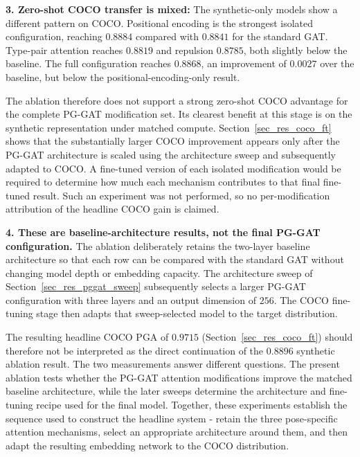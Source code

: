 \textbf{3. Zero-shot COCO transfer is mixed:}
The synthetic-only models show a different pattern on COCO.
Positional encoding is the strongest isolated configuration,
reaching $0.8884$ compared with $0.8841$ for the standard GAT.
Type-pair attention reaches $0.8819$ and repulsion $0.8785$,
both slightly below the baseline.
The full configuration reaches $0.8868$,
an improvement of $0.0027$ over the baseline,
but below the positional-encoding-only result.

The ablation therefore does not support a strong zero-shot COCO
advantage for the complete PG-GAT modification set.
Its clearest benefit at this stage is on the synthetic representation
under matched compute.
Section~\ref{sec_res_coco_ft} shows that the substantially larger
COCO improvement appears only after the PG-GAT architecture is scaled
using the architecture sweep
and subsequently adapted to COCO.
A fine-tuned version of each isolated modification would be required
to determine how much each mechanism contributes to that final
fine-tuned result.
Such an experiment was not performed,
so no per-modification attribution of the headline COCO gain is claimed.

\textbf{4. These are baseline-architecture results, not the final
PG-GAT configuration.}
The ablation deliberately retains the two-layer baseline architecture
so that each row can be compared with the standard GAT without changing
model depth or embedding capacity.
The architecture sweep of Section~\ref{sec_res_pggat_sweep}
subsequently selects a larger PG-GAT configuration with three layers
and an output dimension of $256$.
The COCO fine-tuning stage then adapts that sweep-selected model
to the target distribution.

The resulting headline COCO PGA of $0.9715$
(Section~\ref{sec_res_coco_ft}) should therefore not be interpreted
as the direct continuation of the $0.8896$ synthetic ablation result.
The two measurements answer different questions.
The present ablation tests whether the PG-GAT attention modifications
improve the matched baseline architecture,
while the later sweeps determine the architecture and fine-tuning recipe
used for the final model.
Together, these experiments establish the sequence used to construct
the headline system -
retain the three pose-specific attention mechanisms,
select an appropriate architecture around them,
and then adapt the resulting embedding network to the COCO distribution.